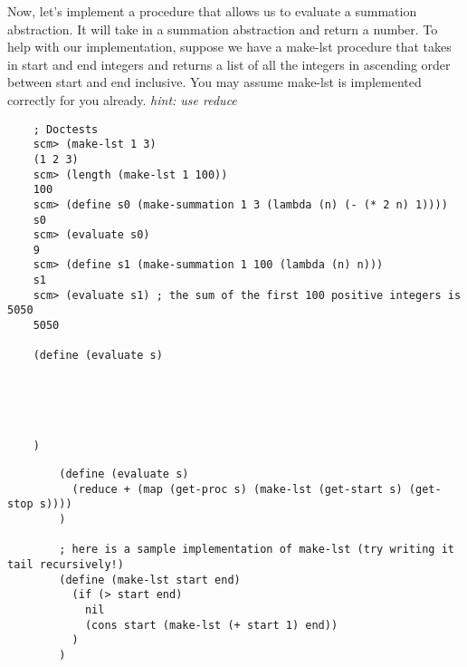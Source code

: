 \begin{blocksection}
    \question Now, let's implement a procedure that allows us to evaluate a summation abstraction. 
    It will take in a summation abstraction and return a number. 
    To help with our implementation, suppose we have a make-lst procedure that takes in start and end 
    integers and returns a list of all the integers in ascending order between start and end inclusive. 
    You may assume make-lst is implemented correctly for you already. \textit{hint: use reduce}

    \begin{lstlisting}
    ; Doctests
    scm> (make-lst 1 3)
    (1 2 3)
    scm> (length (make-lst 1 100))
    100
    scm> (define s0 (make-summation 1 3 (lambda (n) (- (* 2 n) 1))))
    s0
    scm> (evaluate s0)
    9
    scm> (define s1 (make-summation 1 100 (lambda (n) n)))
    s1
    scm> (evaluate s1) ; the sum of the first 100 positive integers is 5050
    5050

    (define (evaluate s)
    




    )
    \end{lstlisting}

    \begin{solution}[1in]
        \begin{lstlisting}
        (define (evaluate s)
          (reduce + (map (get-proc s) (make-lst (get-start s) (get-stop s))))
        )
        
        ; here is a sample implementation of make-lst (try writing it tail recursively!)
        (define (make-lst start end)
          (if (> start end)
            nil
            (cons start (make-lst (+ start 1) end))
          )
        )
        \end{lstlisting}
    \end{solution}
\end{blocksection}

